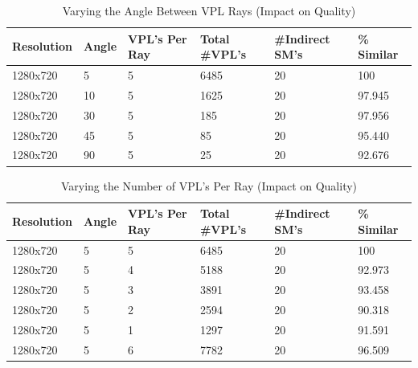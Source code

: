 \begin{table}[h!]
	\caption{Varying the Angle Between VPL Rays (Impact on Quality)}
	\begin{center}
	    \begin{tabular}{ | l | l | l | l | l | l |}
	    \hline
	    Resolution & Angle & VPL's Per Ray & Total \#VPL's & \#Indirect SM's & \% Similar\\ \hline
	    1280x720 & 5 & 5 & 6485 & 20 & 100\\ \hline
	    1280x720 & 10 & 5 & 1625 & 20 & 97.945\\ \hline
	    1280x720 & 30 & 5 & 185 & 20 & 97.956\\ \hline
	    1280x720 & 45 & 5 & 85 & 20 & 95.440\\ \hline
	    1280x720 & 90 & 5 & 25 & 20 & 92.676\\ \hline
	    \end{tabular}
	\end{center}
	\label{table:5.5}
\end{table}

\begin{table}[h!]
	\caption{Varying the Number of VPL's Per Ray (Impact on Quality)}
	\begin{center}
	    \begin{tabular}{ | l | l | l | l | l | l |}
	    \hline
	    Resolution & Angle & VPL's Per Ray & Total \#VPL's & \#Indirect SM's & \% Similar\\ \hline
	    1280x720 & 5 & 5 & 6485 & 20 & 100\\ \hline
	    1280x720 & 5 & 4 & 5188 & 20 & 92.973\\ \hline
	    1280x720 & 5 & 3 & 3891 & 20 & 93.458\\ \hline
	    1280x720 & 5 & 2 & 2594 & 20 & 90.318\\ \hline
	    1280x720 & 5 & 1 & 1297 & 20 & 91.591\\ \hline
	    1280x720 & 5 & 6 & 7782 & 20 & 96.509\\ \hline
	    \end{tabular}
	\end{center}
	\label{table:5.6}
\end{table}

